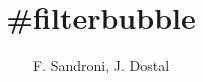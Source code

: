 \documentclass[final]{beamer}
\title{\#filterbubble} %
\author[dostal.jakub@outlook.com]{F. Sandroni, J. Dostal} %
\institute{Slavonic grammar school Olomouc} %
\begin{document}
\setlength{\belowcaptionskip}{2ex} %
\setlength\belowdisplayshortskip{2ex} %

\begin{frame}[fragile]
\begin{columns}[T]
\begin{column}{.33\textwidth}


\end{column}
\end{columns}
\end{frame}
\end{document}
